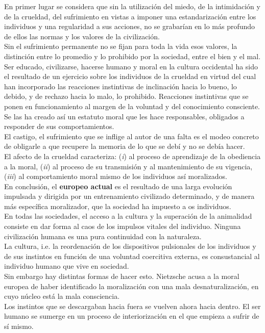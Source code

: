\documentclass[a4paper, 10pt, twocolumn, spanish]{article}
\begin{document}
En primer lugar se considera que sin la utilización del miedo, de la
intimidación y de la crueldad, del sufrimiento en vistas a imponer una
estandarización entre los individuos y una regularidad a sus acciones,
no se grabarían en lo más profundo de ellos las normas y los valores
de la civilización.\\[0pt]
Sin el sufrimiento permanente no se fijan para toda la vida esos
valores, la distinción entre lo promedio y lo prohibido por la
sociedad, entre el bien y el mal.\\[0pt]

Ser educado, civilizarse, hacerse humano y moral en la cultura
occidental ha sido el resultado de un ejercicio sobre los individuos
de la crueldad en virtud del cual han incorporado las reacciones
instintivas de inclinación hacia lo bueno, lo debido, y de rechazo
hacia lo malo, lo prohibido. Reacciones instintivas que se ponen en
funcionamiento al margen de la voluntad y del conocimiento
consciente. Se las ha creado así un estatuto moral que les hace
responsables, obligados a responder de sus comportamientos.\\[0pt]
El castigo, el sufrimiento que se inflige al autor de una falta es el
modeo concreto de obligarle a que recupere la memoria de lo que se
debí y no se debía hacer.\\[0pt]

El afecto de la crueldad caracteriza: (\emph{i}) al proceso de aprendizaje
de la obediencia a la moral, (\emph{ii}) al proceso de su transmisión y al
mantenimiento de su vigencia, (\emph{iii}) al comportamiento moral mismo de
los individuos así moralizados.\\[0pt]

En conclusión, el \textbf{europeo actual} es el resultado de una larga
evolución impulsada y dirigida por un entrenamiento civilizado
determinado, y de manera más específica moralizador, que la sociedad
ha impuesto a os individuos.\\[0pt]
En todas las sociedades, el acceso a la cultura y la superación de la
animalidad consiste en dar forma al caos de los impulsos vitales del
individuo. Ninguna civilización humana es una pura continuidad con la
naturaleza.\\[0pt]
La cultura, i.e. la reordenación de los dispositivos pulsionales de
los individuos y de sus instintos en función de una voluntad
coercitiva externa, es consustancial al individuo humano que vive en
sociedad.\\[0pt]
Sin embargo hay distintas formas de hacer esto. Nietzsche acusa a la
moral europea de haber identificado la moralización con una mala
desnaturalización, en cuyo núcleo está la mala consciencia.\\[0pt]
Los instintos que se descargaban hacia fuera se vuelven ahora hacia
dentro. El ser humano se sumerge en un proceso de interiorización en
el que empieza a sufrir de sí mismo.
\end{document}
